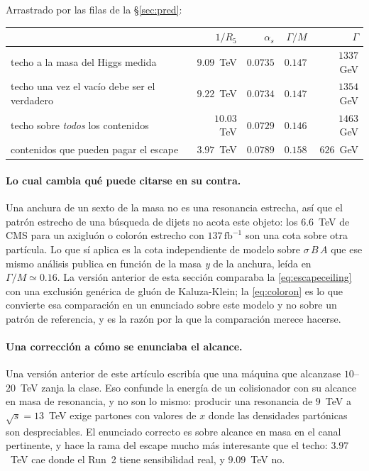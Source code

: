 \noindent Arrastrado por las filas de la \S\ref{sec:pred}:

\begin{center}\small
{}
\begin{tabular}{lrrrr}
\toprule
\rowcolor{hdrblue!10} & $1/R_5$ & $\alpha_s$ & $\Gamma/M$ & $\Gamma$\\
\midrule
\rowcolor{amber!14}techo a la masa del Higgs medida & $9.09$~TeV & $0.0735$ & $0.147$ & $1337$~GeV\\
techo una vez el vacío debe ser el verdadero & $9.22$~TeV & $0.0734$ & $0.147$ & $1354$~GeV\\
techo sobre \emph{todos} los contenidos & $10.03$~TeV & $0.0729$ & $0.146$ & $1463$~GeV\\
contenidos que pueden pagar el escape & $3.97$~TeV & $0.0789$ & $0.158$ & $626$~GeV\\
\bottomrule
\end{tabular}
\end{center}

\paragraph{Lo cual cambia qué puede citarse en su contra.} Una anchura de un sexto de la masa no es
una resonancia estrecha, así que el patrón estrecho de una búsqueda de dijets no acota este objeto:
los $6.6$~TeV de CMS para un axigluón o colorón estrecho con $137\,\mathrm{fb}^{-1}$
\cite{CMSdijet} son una cota sobre otra partícula. Lo que sí aplica es la cota
independiente de modelo sobre $\sigma\,B\,A$ que ese mismo análisis publica en función de la masa
\emph{y} de la anchura, leída en $\Gamma/M\simeq0.16$. La versión anterior de esta sección comparaba
la \eqref{eq:escapeceiling} con una exclusión genérica de gluón de Kaluza-Klein; la
\eqref{eq:coloron} es lo que convierte esa comparación en un enunciado sobre este modelo y no sobre
un patrón de referencia, y es la razón por la que la comparación merece hacerse.

\paragraph{Una corrección a cómo se enunciaba el alcance.} Una versión anterior de este artículo
escribía que una máquina que alcanzase $10$--$20$~TeV zanja la clase. Eso confunde la energía de un
colisionador con su alcance en masa de resonancia, y no son lo mismo: producir una resonancia de
$9$~TeV a $\sqrt s=13$~TeV exige partones con valores de $x$ donde las densidades partónicas son
despreciables. El enunciado correcto es sobre alcance en masa en el canal pertinente, y hace la
rama del escape mucho más interesante que el techo: $3.97$~TeV cae donde el Run~2 tiene
sensibilidad real, y $9.09$~TeV no.


